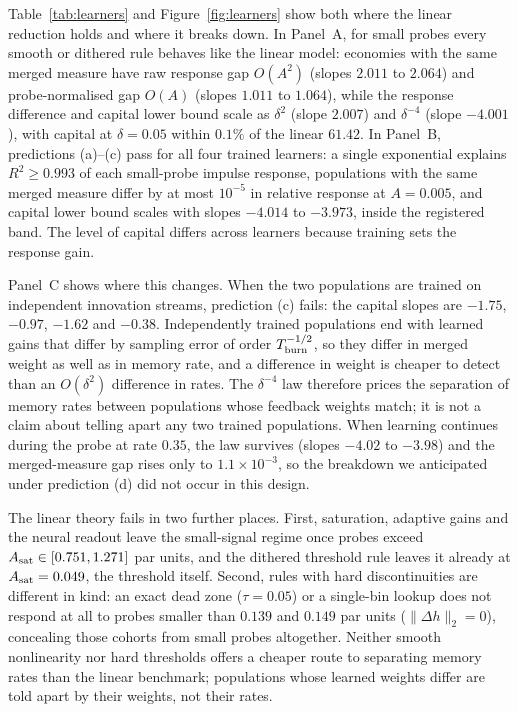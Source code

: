 Table~\ref{tab:learners} and Figure~\ref{fig:learners} show both where the linear reduction holds and where it breaks down. In Panel~A, for small probes every smooth or dithered rule behaves like the linear model: economies with the same merged measure have raw response gap $O(A^2)$ (slopes $2.011$ to $2.064$) and probe-normalised gap $O(A)$ (slopes $1.011$ to $1.064$), while the response difference and capital lower bound scale as $\delta^2$ (slope $2.007$) and $\delta^{-4}$ (slope $-4.001$), with capital at $\delta=0.05$ within $0.1\%$ of the linear $61.42$. In Panel~B, predictions (a)--(c) pass for all four trained learners: a single exponential explains $R^2\ge0.993$ of each small-probe impulse response, populations with the same merged measure differ by at most $10^{-5}$ in relative response at $A=0.005$, and capital lower bound scales with slopes $-4.014$ to $-3.973$, inside the registered band. The level of capital differs across learners because training sets the response gain.

Panel~C shows where this changes. When the two populations are trained on independent innovation streams, prediction (c) fails: the capital slopes are $-1.75$, $-0.97$, $-1.62$ and $-0.38$. Independently trained populations end with learned gains that differ by sampling error of order $T_{\rm burn}^{-1/2}$, so they differ in merged weight as well as in memory rate, and a difference in weight is cheaper to detect than an $O(\delta^2)$ difference in rates. The $\delta^{-4}$ law therefore prices the separation of memory rates between populations whose feedback weights match; it is not a claim about telling apart any two trained populations. When learning continues during the probe at rate $0.35$, the law survives (slopes $-4.02$ to $-3.98$) and the merged-measure gap rises only to $1.1\times10^{-3}$, so the breakdown we anticipated under prediction (d) did not occur in this design.

The linear theory fails in two further places. First, saturation, adaptive gains and the neural readout leave the small-signal regime once probes exceed $A_{\rm sat}\in[0.751,1.271]$ par units, and the dithered threshold rule leaves it already at $A_{\rm sat}=0.049$, the threshold itself. Second, rules with hard discontinuities are different in kind: an exact dead zone ($\tau=0.05$) or a single-bin lookup does not respond at all to probes smaller than $0.139$ and $0.149$ par units ($\|\Delta h\|_2=0$), concealing those cohorts from small probes altogether. Neither smooth nonlinearity nor hard thresholds offers a cheaper route to separating memory rates than the linear benchmark; populations whose learned weights differ are told apart by their weights, not their rates.

